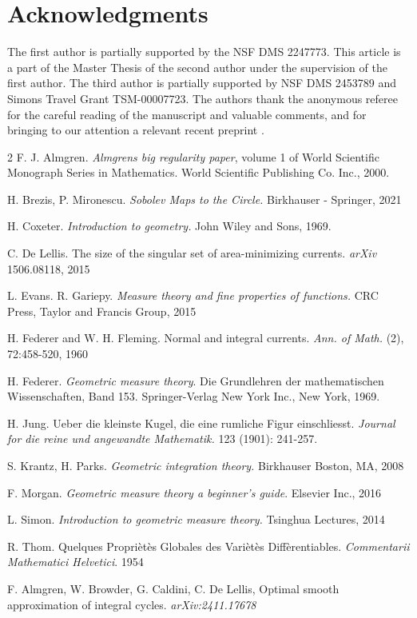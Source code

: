 \documentclass{amsart}
\numberwithin{equation}{section}
\theoremstyle{definition}
\theoremstyle{remark}
\begin{document}
 \section*{Acknowledgments}

The first author is partially supported by the NSF DMS 2247773. This article is a part of the Master Thesis of the second author under the supervision of the first author. The third author is partially supported by NSF DMS 2453789 and Simons Travel Grant TSM-00007723.
The authors thank the anonymous referee for the careful reading of the manuscript and valuable comments, and for 
bringing to our attention a relevant recent preprint \cite{Almg}. %

\begin{thebibliography}{2}
F. J. Almgren.
\textit{Almgrens big regularity paper}, volume 1 of World Scientific Monograph Series in
Mathematics. World Scientific Publishing Co. Inc., 2000.

H. Brezis, P. Mironescu.
\textit{Sobolev Maps to the Circle.}
Birkhauser - Springer, 2021

H. Coxeter.
\textit{Introduction to geometry.}
John Wiley and Sons, 1969.

C. De Lellis.
The size of the singular set of area-minimizing currents. \textit{arXiv} 1506.08118, 2015

L. Evans. R. Gariepy.
\textit{Measure theory and fine properties of functions.}
CRC Press,
Taylor and Francis Group, 2015

H. Federer and W. H. Fleming.
Normal and integral currents.\textit{ Ann. of Math.} (2), 72:458-520, 1960

H. Federer.
\textit{Geometric measure theory}. Die Grundlehren der mathematischen Wissenschaften, Band
153. Springer-Verlag New York Inc., New York, 1969.


H. Jung. Ueber die kleinste Kugel, die eine rumliche Figur einschliesst. \textit{Journal for die reine und angewandte Mathematik.} 123 (1901): 241-257.

S. Krantz, H. Parks.
\textit{Geometric integration theory.}
Birkhauser Boston, MA, 2008

F. Morgan.
\textit{Geometric measure theory a beginner's guide}. Elsevier Inc., 2016


L. Simon. \textit{Introduction to geometric measure theory.} Tsinghua Lectures, 2014

R. Thom. Quelques Propri\`{e}t\`{e}s Globales des Vari\`{e}t\`{e}s Diff\`{e}rentiables. \textit{Commentarii Mathematici Helvetici}. 1954

F. Almgren, W. Browder, G. Caldini, C. De Lellis, Optimal smooth approximation of integral cycles. \textit{arXiv:2411.17678}
\end{thebibliography}
\end{document}
